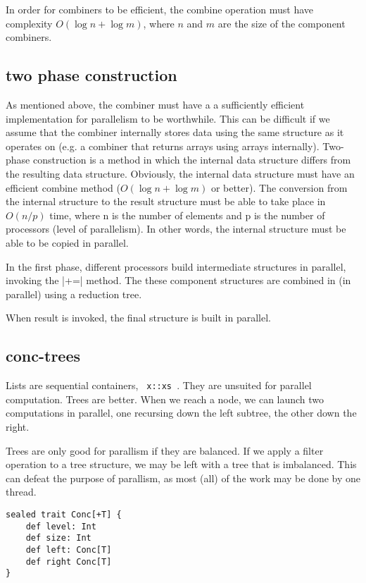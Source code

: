 In order for combiners to be efficient, the combine operation must have complexity $O( \log n + \log m)$, where $n$ and $m$ are the size of the component combiners. 


\subsection{two phase construction}

As mentioned above, the combiner must have a a sufficiently efficient implementation for parallelism to be worthwhile. This can be difficult if we assume that the combiner internally stores data using the same structure as it operates on (e.g. a combiner that returns arrays using arrays internally). Two-phase construction is a method in which the internal data structure differs from the resulting data structure. Obviously, the internal data structure must have an efficient combine method ($O( \log n + \log m)$ or better). The conversion from the internal structure to the result structure must be able to take place in $O(n/p)$ time, where n is the number of elements and p is the number of processors (level of parallelism). In other words, the internal structure must be able to be copied in parallel.

In the first phase, different processors build intermediate structures in parallel, invoking the \listinline|+=| method. The these component structures are combined in (in parallel) using a reduction tree.

When result is invoked, the final structure is built in parallel.

\subsection{conc-trees}
Lists are sequential containers, \lstinline| x::xs |. They are unsuited for parallel computation. Trees are better. When we reach a node, we can launch two computations in parallel, one recursing down the left subtree, the other down the right.

Trees are only good for parallism if they are balanced. If we apply a filter operation to a tree structure, we may be left with a tree that is imbalanced. This can defeat the purpose of parallism, as most (all) of the work may be done by one thread.

\begin{lstlisting}
sealed trait Conc[+T] {
    def level: Int
    def size: Int
    def left: Conc[T]
    def right Conc[T]
}
\end{lstlisting}

